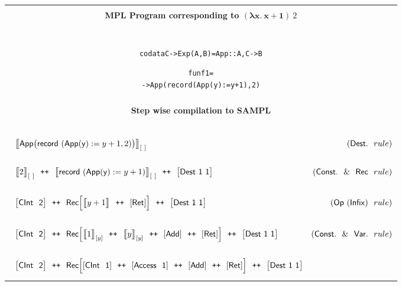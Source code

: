 \documentclass[11pt]{article}
\newcommand{\<}{\langle}
\renewcommand{\>}{\rangle}
\begin{document}
\begin{table}[!h]
\begin{center}
\begin{tabular}{|c|} \hline
{}\\ 
{\bf MPL Program corresponding to $(\mathbf{\lambda x.~x+1})~2$} \\~~\\
\hline\hline 
\begin{minipage}{3in}
\begin{alltt}


codata C -> Exp(A,B) = App :: A,C -> B 

fun f1  =
   ->  App( record(App(y) :=  y + 1),2)


\end{alltt}
\end {minipage} \\ 
\hline 
{}\\ 
{\bf Step wise compilation to SAMPL} \\~~\\
\hline\hline 
\begin{minipage}{6in}
{
  \begin{align*} 
& {\big\llbracket {\sf App}\big({\sf record}~({\sf App(y)}:=y+1,2)\big)\big\rrbracket}_{[~]} 
& ({\sf Dest.}~~rule) \\~~\\ 
& {
   {\big\llbracket2\big\rrbracket}_{[~]} ~~ \texttt{++} ~~
   {\big\llbracket {\sf record}~({\sf App(y)}:=y+1)\big\rrbracket}_{[~]}
   ~~\texttt{++}~~\big[ {\sf Dest~1~1}\big]
  } & ({\sf Const.}~~\&~~{\sf Rec}~~rule) \\~~\\ 
& {
   {\big[{\sf CInt~~2}\big]}~~\texttt{++}~~
   {{\sf Rec}\Big[\big\llbracket y+1 \big\rrbracket~~ \texttt{++}~~[{\sf Ret}]\Big]}
   ~~\texttt{++}~~\big[ {\sf Dest~1~1}\big]
  } & {\sf (Op~(Infix)}~~rule) \\~~\\ 
& {
   \big[{\sf CInt~~2}\big]~~\texttt{++}~~
   {{\sf Rec}\Big[{\big\llbracket 1 \big\rrbracket}_{[y]} ~~ \texttt{++}~~{\big\llbracket y \big\rrbracket}_{[y]}~~\texttt{++}~~[{\sf Add}]~~\texttt{++}~~[{\sf Ret}]\Big]}
   ~~\texttt{++}~~\big[ {\sf Dest~1~1}\big]
  } & ({\sf Const.}~~\&~~{\sf Var.}~~rule) \\~~\\   
& {
   \big[{\sf CInt~~2}\big]~~\texttt{++}~~
   {{\sf Rec}\Big[[{\sf CInt~~1}] ~~ \texttt{++}~~[{\sf Access~~1}]~~
   \texttt{++}~~[{\sf Add}]~~\texttt{++}~~[{\sf Ret}]\Big]}
   ~~\texttt{++}~~\big[ {\sf Dest~1~1}\big]
}
\end{align*}}
\end{minipage}
\end{tabular}
\end{center}
\end{table}
\end{document}

